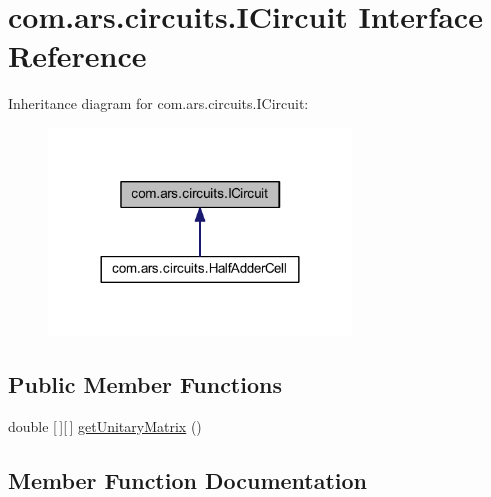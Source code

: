 \hypertarget{interfacecom_1_1ars_1_1circuits_1_1_i_circuit}{}\section{com.\+ars.\+circuits.\+I\+Circuit Interface Reference}
\label{interfacecom_1_1ars_1_1circuits_1_1_i_circuit}


Inheritance diagram for com.\+ars.\+circuits.\+I\+Circuit\+:
\nopagebreak
\begin{figure}[H]
\begin{center}
\leavevmode
\includegraphics[width=228pt]{interfacecom_1_1ars_1_1circuits_1_1_i_circuit__inherit__graph}
\end{center}
\end{figure}
\subsection*{Public Member Functions}
\begin{DoxyCompactItemize}
\item 
double \mbox{[}$\,$\mbox{]}\mbox{[}$\,$\mbox{]} \hyperlink{interfacecom_1_1ars_1_1circuits_1_1_i_circuit_a83a4a39c153cec6a292572228eaecbbc}{get\+Unitary\+Matrix} ()
\end{DoxyCompactItemize}


\subsection{Member Function Documentation}
\hypertarget{interfacecom_1_1ars_1_1circuits_1_1_i_circuit_a83a4a39c153cec6a292572228eaecbbc}{}\label{interfacecom_1_1ars_1_1circuits_1_1_i_circuit_a83a4a39c153cec6a292572228eaecbbc} 
